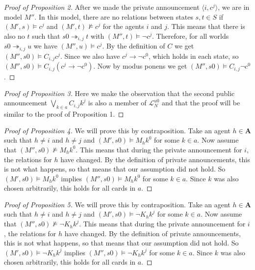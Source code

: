 \documentclass[a4paper, 10pt]{article}
\newcommand{\impl}{\rightarrow}
\newcommand{\A}{\mathbf{A}}
\begin{document}
\begin{proof}[Proof of Proposition 2]
    After we made the private announcement $\langle i, c^j\rangle$, we are
    in model $M''$. In this model, there are no relations between states
    $s, t \in S$ if $(M', s) \models c^j$ and $(M', t) \not \models c^j$
    for the agents $i$ and $j$. This means that there is also no $t$ such
    that $s0 \twoheadrightarrow_{i,j} t$ with $(M'', t) \models \neg c^j$.
    Therefore, for all worlds $s0 \twoheadrightarrow_{i,j} u$ we have
    $(M'', u) \models c^j$. By the definition of $C$ we get $(M'', s0)
    \models C_{i,j} c^j$. Since we also have $c^j \impl \neg c^0$, which
    holds in each state, so $(M'', s0) \models C_{i,j} (c^j \impl \neg
    c^0)$. Now by modus ponens we get $(M'', s0) \models C_{i,j} \neg c^0$.
\end{proof}

\begin{proof}[Proof of Proposition 3]
    Here we make the observation that the second public announcement
    $\bigvee_{k\in a} C_{i,j} k^j$ is also a member of
    $\mathcal{L}_N^{u0}$ and that the proof will be similar to the proof of
    Proposition 1.
\end{proof}

\begin{proof}[Proof of Proposition 4]
    We will prove this by contraposition.
    Take an agent $h \in \A$ such that $h \not = i$ and $h \not = j$ and
    $(M', s0) \models M_h k^0$ for some $k \in a$. Now assume that $(M'',
    s0) \not \models M_h k^0$. This means that during the private
    announcement for $i$, the relations for $h$ have changed. By
    the definition of private announcements, this is not what happens, so
    that means that our assumption did not hold. So $(M', s0) \models M_h
    k^0$ implies $(M'', s0) \models M_h k^0$ for some $k \in a$. Since $k$
    was also chosen arbitrarily, this holds for all cards in $a$. 
\end{proof}

\begin{proof}[Proof of Proposition 5]
    We will prove this by contraposition.
    Take an agent $h \in \A$ such that $h \not = i$ and $h \not = j$ and
    $(M', s0) \models \neg K_h k^j$ for some $k \in a$. Now assume that
    $(M'', s0) \not \models \neg K_h k^j$. This means that during the private
    announcement for $i$, the relations for $h$ have changed. By
    the definition of private announcements, this is not what happens, so
    that means that our assumption did not hold. So $(M', s0) \models \neg
    K_h k^j$ implies $(M'', s0) \models \neg K_h k^j$ for some $k \in a$.
    Since $k$ was also chosen arbitrarily, this holds for all cards in $a$. 
\end{proof}



\end{document}
